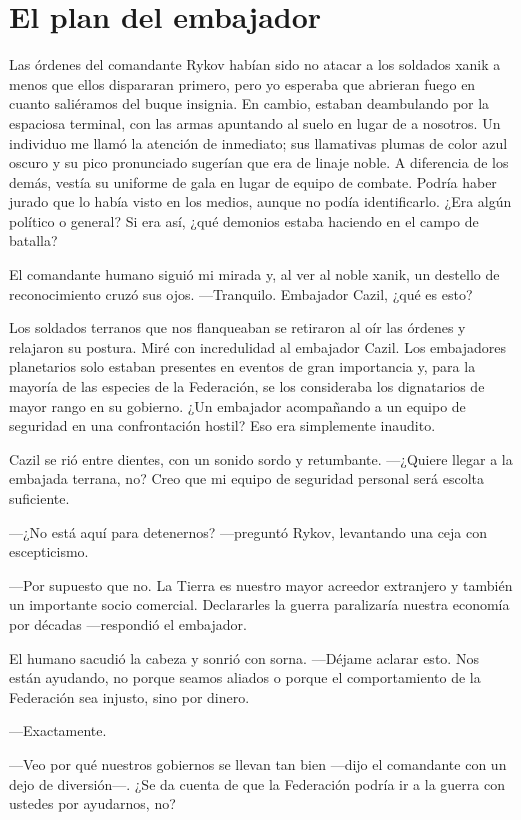 \chapter{El plan del embajador}\label{sec:el-plan-del-embajador}

Las órdenes del comandante Rykov habían sido no atacar a los soldados xanik a menos que ellos dispararan primero, pero yo esperaba que abrieran fuego en cuanto saliéramos del buque insignia. En cambio, estaban deambulando por la espaciosa terminal, con las armas apuntando al suelo en lugar de a nosotros. Un individuo me llamó la atención de inmediato; sus llamativas plumas de color azul oscuro y su pico pronunciado sugerían que era de linaje noble. A diferencia de los demás, vestía su uniforme de gala en lugar de equipo de combate. Podría haber jurado que lo había visto en los medios, aunque no podía identificarlo. ¿Era algún político o general? Si era así, ¿qué demonios estaba haciendo en el campo de batalla?

El comandante humano siguió mi mirada y, al ver al noble xanik, un destello de reconocimiento cruzó sus ojos. —Tranquilo. Embajador Cazil, ¿qué es esto?

Los soldados terranos que nos flanqueaban se retiraron al oír las órdenes y relajaron su postura. Miré con incredulidad al embajador Cazil. Los embajadores planetarios solo estaban presentes en eventos de gran importancia y, para la mayoría de las especies de la Federación, se los consideraba los dignatarios de mayor rango en su gobierno. ¿Un embajador acompañando a un equipo de seguridad en una confrontación hostil? Eso era simplemente inaudito.

Cazil se rió entre dientes, con un sonido sordo y retumbante. —¿Quiere llegar a la embajada terrana, no? Creo que mi equipo de seguridad personal será escolta suficiente.

 —¿No está aquí para detenernos? —preguntó Rykov, levantando una ceja con escepticismo.

—Por supuesto que no. La Tierra es nuestro mayor acreedor extranjero y también un importante socio comercial. Declararles la guerra paralizaría nuestra economía por décadas —respondió el embajador.

El humano sacudió la cabeza y sonrió con sorna. —Déjame aclarar esto. Nos están ayudando, no porque seamos aliados o porque el comportamiento de la Federación sea injusto, sino por dinero.

—Exactamente.

—Veo por qué nuestros gobiernos se llevan tan bien —dijo el comandante con un dejo de diversión—. ¿Se da cuenta de que la Federación podría ir a la guerra con ustedes por ayudarnos, no?

